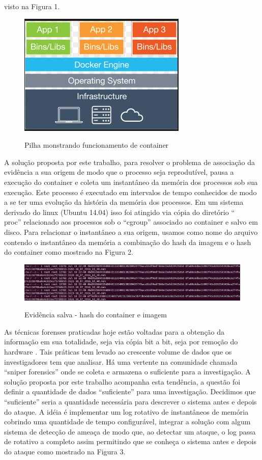 \documentclass[
	12pt,				%
	openright,			%
	oneside,			%
	a4paper,			%
	english,			%
	brazil,				%
	]{abntex2}
\begin{document}
visto na Figura 1. 

\begin{figure}[h]
\caption{Pilha monstrando funcionamento de container}
\includegraphics[scale=0.5]{docker.jpg}
\centering
\label{fig:instantaneo}
\end{figure}

A solução proposta por este trabalho, para resolver o problema de associação da evidência a sua origem de modo que o processo seja reprodutível, pausa a execução
do container e coleta um instantâneo da memória dos processos sob sua execução. Este processo é executado em intervalos de tempo conhecidos de modo a se ter uma
evolução da história da memória dos processos. Em um sistema derivado do linux (Ubuntu 14.04) isso foi atingido via cópia do diretório ``\\proc'' relacionado 
aos processos sob o ``cgroup'' associado ao container e salvo em disco. Para relacionar o instantâneo a sua origem, usamos como nome do arquivo contendo o instantâneo 
da memória a combinação do hash da imagem e o hash do container como mostrado na Figura 2.

\begin{figure}[h!]
\caption{Evidência salva - hash do container e imagem}
\includegraphics[scale=0.3]{snapshot.jpg}
\centering
\label{fig:instantaneo}
\end{figure}

As técnicas forenses praticadas hoje estão voltadas para a obtenção da informação em sua totalidade, seja via cópia bit a bit, seja por remoção do hardware \cite{Simou2014}
\cite{Bem2008}. Tais práticas tem levado ao crescente volume de dados que os investigadores tem que analisar. Há uma vertente na comunidade chamada ``sniper 
forensics'' onde se coleta e armazena o suficiente para a investigação. A solução proposta por este trabalho acompanha esta tendência, a questão foi definir a quantidade 
de dados ``suficiente'' para uma investigação. Decidimos que ``suficiente'' seria a quantidade necessária para descrever o sistema antes e depois do ataque. A idéia é 
implementar um log rotativo de instantâneos de memória cobrindo uma quantidade de tempo configurável, integrar a solução com algum sistema de detecção de ameaça de modo
que, ao detectar um ataque, o log passa de rotativo a completo assim permitindo que se conheça o sistema antes e depois do ataque como mostrado na Figura 3. 
\end{document}
